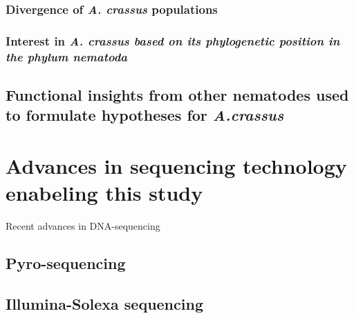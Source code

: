 \subsubsection{Divergence of \textit{A. crassus} populations}


\subsubsection{Interest in \textit{A. crassus based on its
    phylogenetic position in the phylum nematoda}}



\subsection{Functional insights from other nematodes used to formulate
  hypotheses for \textit{A.crassus}}


\section{Advances in sequencing technology enabeling this study}

Recent advances in DNA-sequencing





\subsection{Pyro-sequencing}


\subsection{Illumina-Solexa sequencing}



